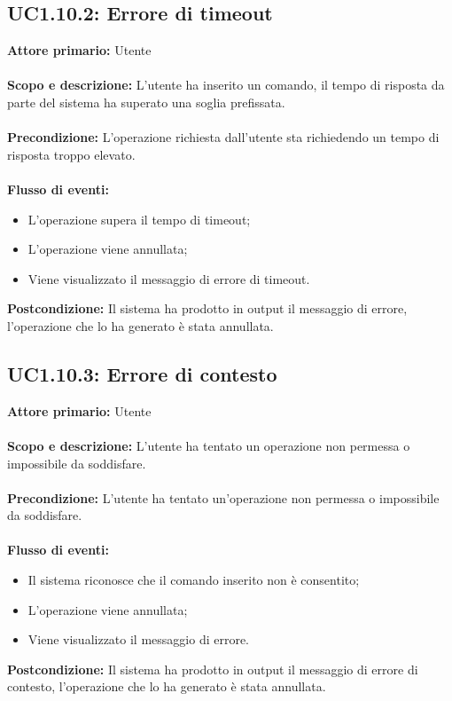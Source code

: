 \documentclass{scalatekids-article}
\begin{document}
\subsection{UC1.10.2: Errore di timeout}
\textbf{Attore primario:} Utente \\ \\
\textbf{Scopo e descrizione:} L'utente ha inserito un comando, il tempo di risposta da parte del sistema ha superato una soglia prefissata.\\ \\
\textbf{Precondizione:} L'operazione richiesta dall'utente sta richiedendo un tempo di risposta troppo elevato.\\ \\
\textbf{Flusso di eventi:}
\begin{itemize}
\item L'operazione supera il tempo di timeout;
\item L'operazione viene annullata;
\item Viene visualizzato il messaggio di errore di timeout.
\end{itemize}
\textbf{Postcondizione:} Il sistema ha prodotto in output il messaggio di errore, l'operazione che lo ha generato è stata annullata.
\subsection{UC1.10.3: Errore di contesto}
\textbf{Attore primario:} Utente \\ \\
\textbf{Scopo e descrizione:} L'utente ha tentato un operazione non permessa o impossibile da soddisfare.\\ \\
\textbf{Precondizione:} L'utente ha tentato un'operazione non permessa o impossibile da soddisfare.\\ \\
\textbf{Flusso di eventi:}
\begin{itemize}
\item Il sistema riconosce che il comando inserito non è consentito;
\item L'operazione viene annullata;
\item Viene visualizzato il messaggio di errore.
\end{itemize}
\textbf{Postcondizione:} Il sistema ha prodotto in output il messaggio di errore di contesto, l'operazione che lo ha generato è stata annullata.
\end{document}
